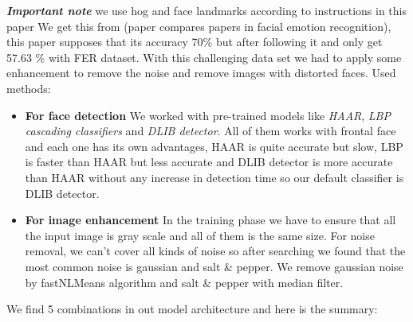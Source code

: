 \documentclass{article}
\begin{document}
\textbf{\textit{Important note }} we use hog and face landmarks according to instructions in this paper \cite{method_5}  \newline
We get this from \cite{state_of_art} (paper compares papers in facial emotion recognition), this paper supposes that its accuracy 70\% but after following it and only get 57.63 \% with FER dataset. \newline
With this challenging data set we had to apply some enhancement to remove the noise and remove images with distorted faces. \newline
Used methods: \newline
\begin{itemize}
\item \textbf{For face detection} 
\newline We worked with pre-trained models like \textit{HAAR}, \textit{LBP cascading classifiers} and \textit{DLIB detector}. \newline All of them works with frontal face and each one has its own advantages, HAAR is quite accurate but slow, LBP is faster than HAAR but less accurate and DLIB detector is more accurate than HAAR without any increase in detection time so our default classifier is DLIB detector. 
\item \textbf{For image enhancement} 
\newline In the training phase we have to ensure that all the input image is gray scale and all of them is the same size. 
\newline For noise removal, we can’t cover all kinds of noise so after searching we found that the most common noise is gaussian and salt & pepper. 
\newline  We remove gaussian noise by fastNLMeans algorithm and salt & pepper with median filter. \newline
\end{itemize}
We find 5 combinations in out model architecture and here is the summary: 
\end{document}
